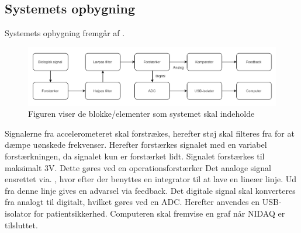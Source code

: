 


\subsection{Systemets opbygning}
Systemets opbygning fremgår af .

\begin{figure}[H]
	\centering
	\includegraphics[scale=0.62]{figures/cProblemloesning/Systemopbygning.PNG}
	\caption{Figuren viser de blokke/elementer som systemet skal indeholde}
	\label{kravblok}
\end{figure}

Signalerne fra accelerometeret skal forstrækes, herefter støj skal filteres fra for at dæmpe uønskede frekvenser. Herefter forstærkes signalet med en variabel forstærkningen, da signalet kun er forstærket lidt. Signalet forstærkes til maksimalt 3V. Dette gøres ved en operationsforstærker  Det analoge signal ensrettet via. , hvor efter der benyttes en integrator til at lave en lineær linje. Ud fra denne linje gives en advarsel via feedback. Det digitale signal skal konverteres fra analogt til digitalt, hvilket gøres ved en ADC.  Herefter anvendes en USB-isolator for patientsikkerhed. Computeren skal fremvise en graf når NIDAQ er tilsluttet. 


